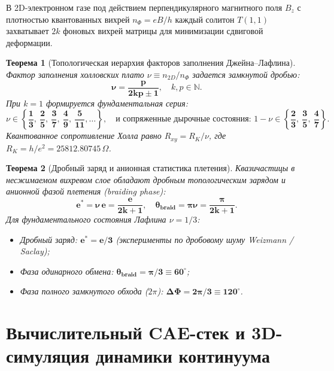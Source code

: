 \documentclass[11pt,a4paper,oneside]{article}
\theoremstyle{plain}
\newtheorem{theorem}{Теорема}[section]
\theoremstyle{definition}
\theoremstyle{remark}
\numberwithin{equation}{section}
\begin{document}
В 2D-электронном газе под действием перпендикулярного магнитного поля $B_z$ с плотностью квантованных вихрей $n_\Phi = eB/h$ каждый солитон $T(1,1)$ захватывает $2k$ фоновых вихрей матрицы для минимизации сдвиговой деформации.

\begin{theorem}[Топологическая иерархия факторов заполнения Джейна--Лафлина]
Фактор заполнения холловских плато $\nu \equiv n_{2D} / n_\Phi$ задается замкнутой дробью:
\begin{equation}
	\mathbf{\nu = \frac{p}{2k p \pm 1}}, \quad k, p \in \mathbb{N}.
	\label{eq:jain_hierarchy}
\end{equation}
При $k=1$ формируется фундаментальная серия:
\begin{equation}
	\nu \in \left\{ \mathbf{\frac{1}{3}, \ \frac{2}{5}, \ \frac{3}{7}, \ \frac{4}{9}, \ \frac{5}{11}, \dots} \right\}, \quad \text{и сопряженные дырочные состояния: } 1 - \nu \in \left\{ \mathbf{\frac{2}{3}, \ \frac{3}{5}, \ \frac{4}{7}} \right\}.
\end{equation}
Квантованное сопротивление Холла равно $R_{xy} = R_K / \nu$, где $R_K = h/e^2 = 25812.80745\,\Omega$.
\end{theorem}

\begin{theorem}[Дробный заряд и анионная статистика плетения]
Квазичастицы в несжимаемом вихревом слое обладают дробным топологическим зарядом и анионной фазой плетения (braiding phase):
\begin{equation}
	\mathbf{e^* = \nu \, e = \frac{e}{2k + 1}}, \quad \mathbf{\theta_{\text{braid}} = \pi \nu = \frac{\pi}{2k + 1}}.
\end{equation}
Для фундаментального состояния Лафлина $\nu = 1/3$:
\begin{itemize}
	\item Дробный заряд: $\mathbf{e^* = e / 3}$ (эксперименты по дробовому шуму Weizmann / Saclay);
	\item Фаза одинарного обмена: $\mathbf{\theta_{\text{braid}} = \pi / 3 \equiv 60^\circ}$;
	\item Фаза полного замкнутого обхода ($2\pi$): $\mathbf{\Delta\Phi = 2\pi / 3 \equiv 120^\circ}$.
\end{itemize}
\end{theorem}

\section{Вычислительный CAE-стек и 3D-симуляция динамики континуума}
\end{document}

